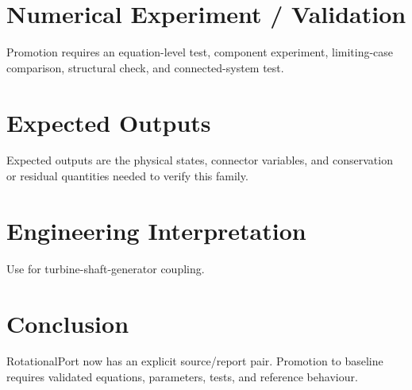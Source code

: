 \documentclass[10pt,a4paper]{article}
\begin{document}
\section{Numerical Experiment / Validation}
Promotion requires an equation-level test, component experiment, limiting-case comparison, structural check, and connected-system test.
\section{Expected Outputs}
Expected outputs are the physical states, connector variables, and conservation or residual quantities needed to verify this family.
\section{Engineering Interpretation}
Use for turbine-shaft-generator coupling.
\section*{Conclusion}
RotationalPort now has an explicit source/report pair. Promotion to baseline requires validated equations, parameters, tests, and reference behaviour.
\end{document}

